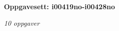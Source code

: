 \centerline{\bf Oppgavesett: i00419no-i00428no}
\vskip 10pt
\centerline{\it 10 oppgaver}\vskip 10pt
\vskip 10pt
